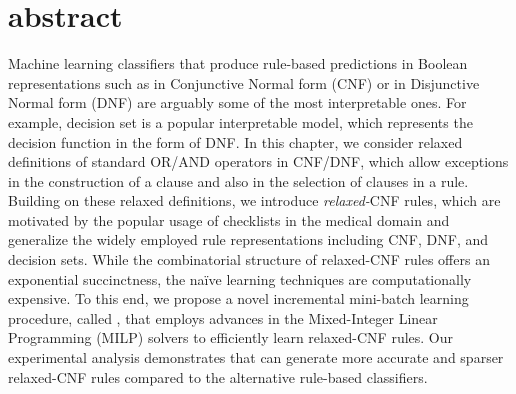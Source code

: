 \section{abstract}
	 Machine learning classifiers that produce  rule-based predictions in Boolean representations such as in Conjunctive Normal form (CNF) or in Disjunctive Normal form (DNF) are arguably some of the most interpretable ones. For example, decision set is a popular interpretable model, which represents the decision function in the form of DNF. In this chapter, we consider relaxed definitions of standard OR/AND operators in CNF/DNF, which allow exceptions in the construction of a clause and also in the selection of clauses in a rule. Building on these relaxed definitions,  we introduce \textit{relaxed-}CNF rules, which are motivated by the popular usage of checklists in the medical domain and generalize the widely employed rule representations including CNF, DNF, and decision sets.  While the combinatorial structure of relaxed-CNF rules offers an exponential succinctness, the na\"ive learning techniques are computationally expensive. 	 To this end, we  propose a novel incremental mini-batch learning procedure, called {\crr}, that employs  advances in the  Mixed-Integer Linear Programming (MILP) solvers to efficiently learn relaxed-CNF rules. Our  experimental analysis demonstrates that {\crr} can generate more accurate and sparser relaxed-CNF rules compared to the alternative rule-based classifiers. 


